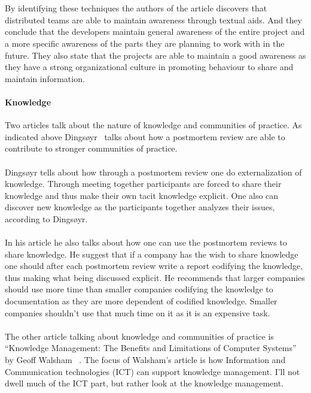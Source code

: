 \documentclass[12pt]{article}
\begin{document}
\\\\
By identifying these techniques the authors of the article discovers that distributed teams are able to maintain awareness through textual aids. And they conclude that the developers maintain general awareness of the entire project and a more specific awareness of the parts they are planning to work with in the future. They also state that the projects are able to maintain a good awareness as they have a strong organizational culture in promoting behaviour to share and maintain information. 

\paragraph{Knowledge}
Two articles talk about the nature of knowledge and communities of practice. As indicated above Dingsøyr~\cite{Dingsoyr} talks about how a postmortem review are able to contribute to stronger communities of practice. 
\\\\
Dingsøyr tells about how through a postmortem review one do externalization of knowledge. Through meeting together participants are forced to share their knowledge and thus make their own tacit knowledge explicit. One also can discover new knowledge as the participants together analyzes their issues, according to Dingsøyr.
\\\\
In his article he also talks about how one can use the postmortem reviews to share knowledge. He suggest that if a company has the wish to share knowledge one should after each postmortem review write a report codifying the knowledge, thus making what being discussed explicit. He recommends that larger companies should use more time than smaller companies codifying the knowledge to documentation as they are more dependent of codified knowledge. Smaller companies shouldn't use that much time on it as it is an expensive task.
\\\\
The other article talking about knowledge and communities of practice is ``Knowledge Management: The Benefits and Limitations of Computer Systems'' by Geoff Walsham ~\cite{Walsham}. The focus of Walsham's article is how Information and Communication technologies (ICT) can support knowledge management. I'll not dwell much of the ICT part, but rather look at the knowledge management. 
\\\\
\end{document}

